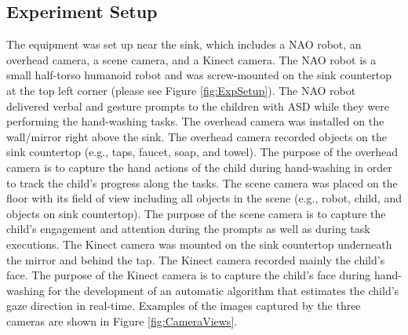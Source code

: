 \documentclass{ut-thesis}
\begin{document}
\subsection{Experiment Setup}
\label{Sec:ExpSetup}
The equipment was set up near the sink, which includes a NAO robot, an overhead camera, a scene camera, and a Kinect camera. The NAO robot is a small half-torso humanoid robot and was screw-mounted on the sink countertop at the top left corner (please see Figure \ref{fig:ExpSetup}). The NAO robot delivered verbal and gesture prompts to the children with ASD while they were performing the hand-washing tasks.  The overhead camera was installed on the wall/mirror right above the sink. The overhead camera recorded objects on the sink countertop (e.g., taps, faucet, soap, and towel). The purpose of the overhead camera is to capture the hand actions of the child during hand-washing in order to track the child’s progress along the tasks. The scene camera was placed on the floor with its field of view including all objects in the scene (e.g., robot, child, and objects on sink countertop). The purpose of the scene camera is to capture the child’s engagement and attention during the prompts as well as during task executions. The Kinect camera was mounted on the sink countertop underneath the mirror and behind the tap. The Kinect camera recorded mainly the child’s face. The purpose of the Kinect camera is to capture the child’s face during hand-washing for the development of an automatic algorithm that estimates the child’s gaze direction in real-time. Examples of the images captured by the three cameras are shown in Figure \ref{fig:CameraViews}.
\end{document}
